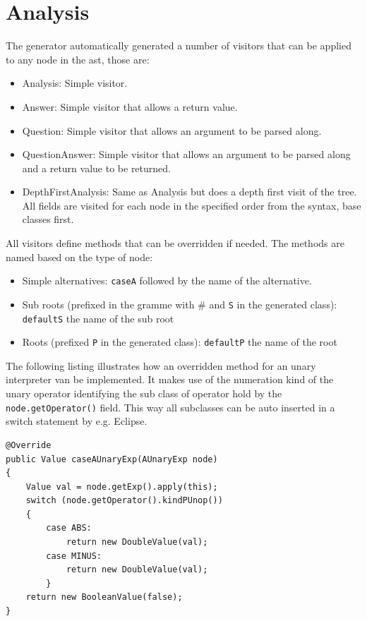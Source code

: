 \documentclass{overturerepchap}
\begin{document}




\section{Analysis}

The generator automatically generated a number of  visitors that can be applied to any node in the ast, those are:

\begin{itemize}
\item Analysis: Simple visitor.
\item Answer: Simple visitor that allows a return value.
\item Question: Simple visitor that allows an argument to be parsed along.
\item QuestionAnswer: Simple visitor that allows an argument to be parsed along and a return value to be returned.
\item DepthFirstAnalysis: Same as Analysis but does a depth first visit of the tree. All fields are visited for each node in the specified order from the syntax, base classes first.
\end{itemize}

All visitors define methods that can be overridden if needed. The methods are named based on the type of node:
\begin{itemize}
\item Simple alternatives: \texttt{caseA} followed by the name of the alternative.
\item Sub roots (prefixed in the gramme with \# and \texttt{S} in the generated class): \texttt{defaultS} the name of the sub root
\item Roots (prefixed \texttt{P} in the generated class): \texttt{defaultP} the name of the root
\end{itemize} 

The following listing illustrates how an overridden method for an unary interpreter van be implemented. It makes use of the numeration kind of the unary operator identifying the sub class of operator hold by the \texttt{node.getOperator()} field. This way all subclasses can be auto inserted in a switch statement by e.g. Eclipse.

\lstset{language=Java,basicstyle=\footnotesize\ttfamily}
\begin{lstlisting}
@Override
public Value caseAUnaryExp(AUnaryExp node)
{
	Value val = node.getExp().apply(this);
	switch (node.getOperator().kindPUnop())
	{
		case ABS:
			return new DoubleValue(val);
		case MINUS:
			return new DoubleValue(val);
		}
	return new BooleanValue(false);
}
\end{lstlisting}
\end{document}
